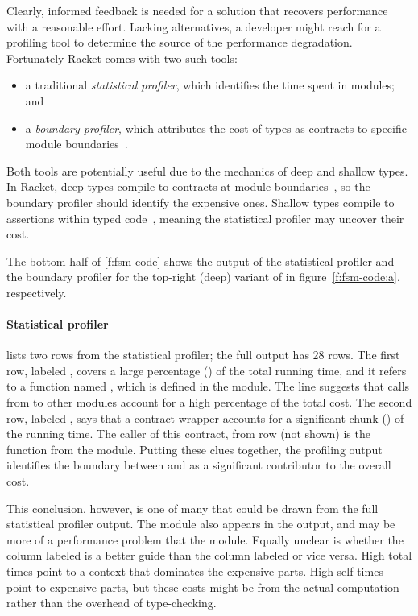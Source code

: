 Clearly, informed feedback is needed for a solution that recovers performance
with a reasonable effort. Lacking alternatives, a developer might reach for a
profiling tool to determine the source of the performance
degradation. Fortunately Racket comes with two such tools: 
\begin{itemize}

\item a traditional \emph{statistical profiler}, which identifies the time spent
 in modules; and

\item a \emph{boundary profiler}, which  attributes the cost of types-as-contracts to
 specific module boundaries~\cite{astavf-feature-prf, staaf-feature-prf}.
 
\end{itemize}
Both tools are potentially useful due to the mechanics of deep and shallow types.
In Racket, deep types compile to contracts at module
boundaries~\cite{tf-popl-2008}, so the boundary profiler should identify the
expensive ones.  Shallow types compile to assertions within typed
code~\cite{glfd-pj-2022}, meaning the statistical profiler may uncover their
cost.

The bottom half of \cref{f:fsm-code} shows the output of the statistical
profiler and the boundary profiler for the top-right (deep) variant of  in
figure~\ref{f:fsm-code:a}, respectively.

\paragraph{Statistical profiler}  lists two
rows from the statistical profiler; the full output has 28 rows.  The
first row, labeled \code{[17]}, covers a large percentage () of the
total running time, and it refers to a function named , which is
defined in the  module. The line suggests that calls from
 to other modules account for a high percentage of the total cost.
The second row, labeled \code{[24]}, says that a contract wrapper accounts for a
significant chunk () of the running time.  The caller of this
contract, from row \code{[19]} (not shown) is the function 
from the  module.  Putting these clues together, the profiling output
identifies the boundary between  and  as a significant
contributor to the overall cost. 

This conclusion, however, is one of many that could be drawn from the full
statistical profiler output.  The  module also appears in the output,
and may be more of a performance problem that the  module.  Equally
unclear is whether the column labeled  is a better guide than
the column labeled  or vice versa.  High
total times point to a context that dominates the expensive parts.  High self
times point to expensive parts, but these costs might be from the actual
computation rather than the overhead of type-checking.


